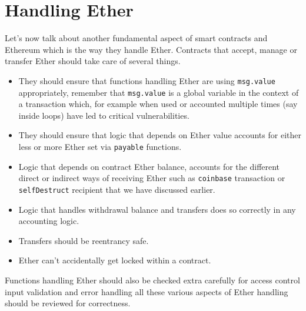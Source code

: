 \section{Handling Ether}\label{handling-ether}

Let's now talk about another fundamental aspect of smart contracts and
Ethereum which is the way they handle Ether. Contracts that accept,
manage or transfer Ether should take care of several things.

\begin{itemize}
\tightlist
\item
  They should ensure that functions handling Ether are using
  \texttt{msg.value} appropriately, remember that \texttt{msg.value} is
  a global variable in the context of a transaction which, for example
  when used or accounted multiple times (say inside loops) have led to
  critical vulnerabilities.
\item
  They should ensure that logic that depends on Ether value accounts for
  either less or more Ether set via \texttt{payable} functions.
\item
  Logic that depends on contract Ether balance, accounts for the
  different direct or indirect ways of receiving Ether such as
  \texttt{coinbase} transaction or \texttt{selfDestruct} recipient that
  we have discussed earlier.
\item
  Logic that handles withdrawal balance and transfers does so correctly
  in any accounting logic.
\item
  Transfers should be reentrancy safe.
\item
  Ether can't accidentally get locked within a contract.
\end{itemize}

Functions handling Ether should also be checked extra carefully for
access control input validation and error handling all these various
aspects of Ether handling should be reviewed for correctness.
